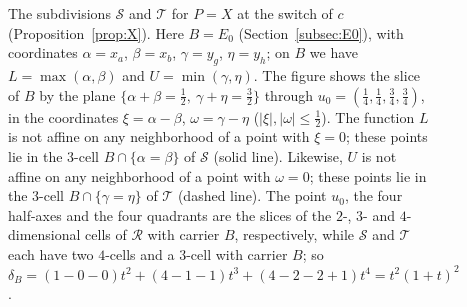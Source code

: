 \documentclass[11pt]{article}
\theoremstyle{definition}
\theoremstyle{remark}
\newcommand{\SSS}{\mathcal S}
\newcommand{\TT}{\mathcal T}
\newcommand{\RR}{\mathcal R}
\begin{document}
\begin{figure}[!tb]
\centering
\begin{minipage}{0.28\textwidth}
\centering
{}
\end{minipage}\hfill
\begin{minipage}{0.70\textwidth}
\caption{The subdivisions $\SSS$ and $\TT$ for $P=X$ at the switch of $c$
(Proposition~\ref{prop:X}). Here $B=E_0$ (Section~\ref{subsec:E0}), with coordinates $\alpha=x_a$, $\beta=x_b$, $\gamma=y_g$, $\eta=y_h$; on $B$ we have $L=\max(\alpha,\beta)$ and $U=\min(\gamma,\eta)$. The figure shows the slice of $B$ by the plane
$\{\alpha+\beta=\frac12,\ \gamma+\eta=\frac32\}$ through
$u_0=(\frac14,\frac14,\frac34,\frac34)$, in the coordinates
$\xi=\alpha-\beta$, $\omega=\gamma-\eta$ ($|\xi|,|\omega|\leq\frac12$).
The function $L$ is not affine on any neighborhood of a point with $\xi=0$; these points lie in the $3$-cell $B\cap\{\alpha=\beta\}$ of $\SSS$ (solid line). Likewise, $U$ is not affine on any neighborhood of a point with $\omega=0$; these points lie in the $3$-cell $B\cap\{\gamma=\eta\}$ of $\TT$ (dashed line). The point
$u_0$, the four half-axes and the four quadrants are the slices of the $2$-, $3$- and $4$-dimensional cells of $\RR$ with carrier $B$, respectively, while $\SSS$ and $\TT$ each have two
$4$-cells and a $3$-cell with carrier $B$; so
$\delta_B=(1-0-0)t^2+(4-1-1)t^3+(4-2-2+1)t^4=t^2(1+t)^2$.}
\label{fig:slice}
\end{minipage}
\end{figure}
\end{document}
